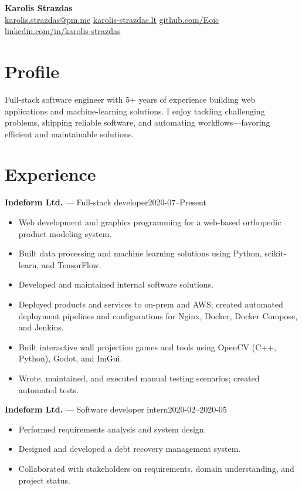 \documentclass[10pt,a4paper]{article}
\makeatletter
\newcommand{\entry}[3]{\noindent\textbf{#1} — #2\hfill #3\\}
\newcommand{\Name}{Karolis Strazdas}
\newcommand{\Email}{karolis.strazdas@pm.me}
\newcommand{\Website}{https://karolis-strazdas.lt}
\newcommand{\GitHub}{https://github.com/Eoic}
\newcommand{\LinkedIn}{https://www.linkedin.com/in/karolis-strazdas/}
\makeatother
\begin{document}
\begin{center}
{\Huge\bfseries \Name}\\[0.2em]
\small \href{mailto:\Email}{\Email} \quad\textbullet\quad \href{\Website}{karolis-strazdas.lt} \quad\textbullet\quad \href{\GitHub}{github.com/Eoic} \quad\textbullet\quad \href{\LinkedIn}{linkedin.com/in/karolis-strazdas}
\end{center}

\vspace{0.3em}

\section*{Profile}
Full-stack software engineer with 5+ years of experience building web applications and machine-learning solutions. I enjoy tackling challenging problems, shipping reliable software, and automating workflows—favoring efficient and maintainable solutions.

\section*{Experience}
\entry{Indeform Ltd.}{Full-stack developer}{2020-07--Present}
\vspace{-0.8em}
\begin{itemize}[leftmargin=*,itemsep=0.08em,topsep=0.02em]
  \item Web development and graphics programming for a web-based orthopedic product modeling system.
  \item Built data processing and machine learning solutions using Python, scikit-learn, and TensorFlow.
  \item Developed and maintained internal software solutions.
  \item Deployed products and services to on-prem and AWS; created automated deployment pipelines and configurations for Nginx, Docker, Docker Compose, and Jenkins.
  \item Built interactive wall projection games and tools using OpenCV (C++, Python), Godot, and ImGui.
  \item Wrote, maintained, and executed manual testing scenarios; created automated tests.
\end{itemize}

\vspace{0.2em}

\entry{Indeform Ltd.}{Software developer intern}{2020-02--2020-05}
\vspace{-0.8em}
\begin{itemize}[leftmargin=*,itemsep=0.08em,topsep=0.02em]
  \item Performed requirements analysis and system design.
  \item Designed and developed a debt recovery management system.
  \item Collaborated with stakeholders on requirements, domain understanding, and project status.
\end{itemize}
\end{document}
